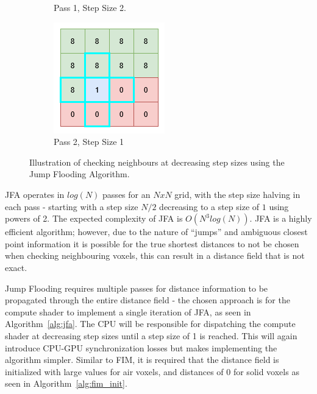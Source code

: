 \begin{figure}[htbp]
\begin{subfigure}[t]{0.32\textwidth}
        \caption{Pass 1, Step Size 2.}
    \end{subfigure}
    \hfill
    \begin{subfigure}[t]{0.32\textwidth}
        \centering
        \includegraphics[width=\textwidth]{figures/jfa_pass_2.drawio.png}
        \caption{Pass 2, Step Size 1}
    \end{subfigure}
    \caption{Illustration of checking neighbours at decreasing step sizes using the Jump Flooding Algorithm.}
    \label{fig:jfa_passes}
\end{figure}


JFA operates in \(log(N)\) passes for an \(NxN\) grid, with the step size halving in each pass - starting with a step
size \(N / 2\) decreasing to a step size of \(1\) using powers of 2. The expected complexity of JFA is \(O(N^3log(N))\).
JFA is a highly efficient algorithm; however, due to the nature of ``jumps'' and ambiguous closest point information it
is possible for the true shortest distances to not be chosen when checking neighbouring voxels, this can result in a
distance field that is not exact.

Jump Flooding requires multiple passes for distance information to be propagated through the entire distance field - the
chosen approach is for the compute shader to implement a single iteration of JFA, as seen in Algorithm~\ref{alg:jfa}.
The CPU will be responsible for dispatching the compute shader at decreasing step sizes until a step size of 1 is
reached. This will again introduce CPU-GPU synchronization losses but makes implementing the algorithm simpler. Similar
to FIM, it is required that the distance field is initialized with large values for air voxels, and distances of \(0\)
for solid voxels as seen in Algorithm~\ref{alg:fim_init}.

